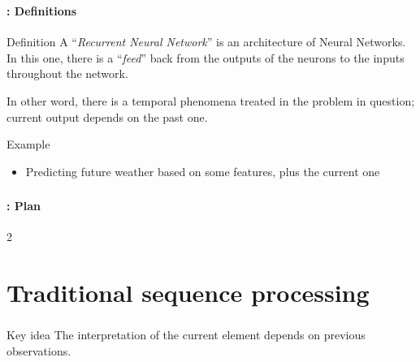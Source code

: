 \documentclass[xcolor=table]{beamer}
\begin{document}
\begin{frame}
	\frametitle{\inserttitle}
	\framesubtitle{\insertshortsubtitle: Definitions}
	
	\begin{block}{Definition}
		\vspace{6pt}
		A ``\textit{Recurrent Neural Network}'' is an architecture of Neural Networks. 
		In this one, there is a ``\textit{feed}'' back from the outputs of the neurons to the inputs throughout the network. \cite{2006-sazli}
		
		\vspace{6pt}
		In other word, there is a temporal phenomena treated in the problem in question; current output depends on the past one.
		\vspace{6pt}
	\end{block}
	
	\begin{exampleblock}{Example}
		\begin{itemize}
			\item Predicting future weather based on some features, plus the current one
		\end{itemize}
	\end{exampleblock}
	
\end{frame}

\begin{frame}
	\frametitle{\inserttitle}
	\framesubtitle{\insertshortsubtitle: Plan}
	
	\begin{multicols}{2}
		\tableofcontents
	\end{multicols}
\end{frame}

\section{Traditional sequence processing}

\begin{frame}
	\frametitle{\insertshortsubtitle}
	\framesubtitle{\insertsection}
	
	\begin{center}
	\end{center}
	
	
	\begin{alertblock}{Key idea}
		The interpretation of the current element depends on previous observations.
	\end{alertblock}
	
\end{frame}
\end{document}
